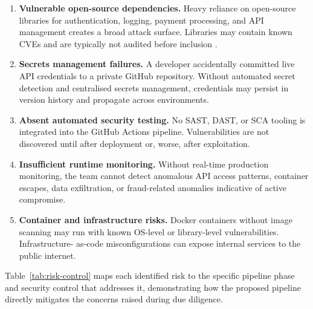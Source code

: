 \documentclass[12pt,a4paper]{article}
\begin{document}
\begin{enumerate}
  \item \textbf{Vulnerable open-source dependencies.} Heavy reliance on open-source
    libraries for authentication, logging, payment processing, and API management creates
    a broad attack surface. Libraries may contain known CVEs and are typically not
    audited before inclusion \citep{snyk2023}.

  \item \textbf{Secrets management failures.} A developer accidentally committed live
    API credentials to a private GitHub repository. Without automated secret detection
    and centralised secrets management, credentials may persist in version history and
    propagate across environments.

  \item \textbf{Absent automated security testing.} No SAST, DAST, or SCA tooling is
    integrated into the GitHub Actions pipeline. Vulnerabilities are not discovered until
    after deployment or, worse, after exploitation.

  \item \textbf{Insufficient runtime monitoring.} Without real-time production
    monitoring, the team cannot detect anomalous API access patterns, container escapes,
    data exfiltration, or fraud-related anomalies indicative of active compromise.

  \item \textbf{Container and infrastructure risks.} Docker containers without image
    scanning may run with known OS-level or library-level vulnerabilities. Infrastructure-
    as-code misconfigurations can expose internal services to the public internet.
\end{enumerate}

Table~\ref{tab:risk-control} maps each identified risk to the specific pipeline phase and
security control that addresses it, demonstrating how the proposed pipeline directly
mitigates the concerns raised during due diligence.
\end{document}
